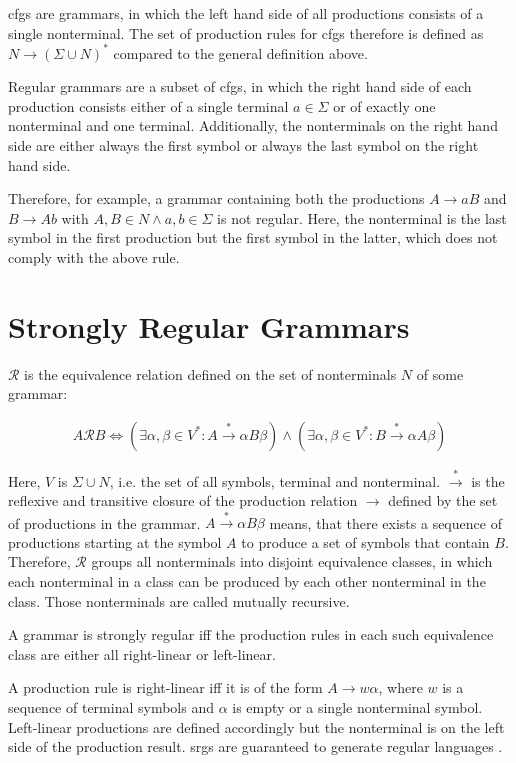 \Acfp{cfg} are grammars, in which the left hand side of all productions consists of a single nonterminal. The set of production rules for \acp{cfg} therefore is defined as $N \rightarrow (\Sigma \cup N)^*$ compared to the general definition above.

Regular grammars are a subset of \acp{cfg}, in which the right hand side of each production consists either of a single terminal $a \in \Sigma$ or of exactly one nonterminal and one terminal. Additionally, the nonterminals on the right hand side are either always the first symbol or always the last symbol on the right hand side. 

Therefore, for example, a grammar containing both the productions $A \rightarrow aB$ and $B \rightarrow Ab$ with $A, B \in N \land a, b \in \Sigma$ is not regular. Here, the nonterminal is the last symbol in the first production but the first symbol in the latter, which does not comply with the above rule.

\section{Strongly Regular Grammars}\label{sec:background:srg}

$\mathcal{R}$ is the equivalence relation defined on the set of nonterminals $N$ of some grammar:

\begin{align}
	A \mathcal{R} B \Leftrightarrow (\exists \alpha, \beta \in V^* : A \xrightarrow{*} \alpha B \beta) \land (\exists \alpha, \beta \in V^* : B \xrightarrow{*} \alpha A \beta) 
\end{align}

Here, $V$ is $\Sigma \cup N$, i.e. the set of all symbols, terminal and nonterminal. $\xrightarrow{*}$ is the reflexive and transitive closure of the production relation $\rightarrow$ defined by the set of productions in the grammar. $A \xrightarrow{*} \alpha B \beta$ means, that there exists a sequence of productions starting at the symbol $A$ to produce a set of symbols that contain $B$. Therefore, $\mathcal{R}$ groups all nonterminals into disjoint equivalence classes, in which each nonterminal in a class can be produced by each other nonterminal in the class. Those nonterminals are called mutually recursive.

A grammar is strongly regular iff the production rules in each such equivalence class are either all right-linear or left-linear.

A production rule is right-linear iff it is of the form $A \rightarrow w \alpha$, where $w$ is a sequence of terminal symbols and $\alpha$ is empty or a single nonterminal symbol. Left-linear productions are defined accordingly but the nonterminal is on the left side of the production result.
\Aclp{srg} are guaranteed to generate regular languages \cite{mohri_nederhof}.

